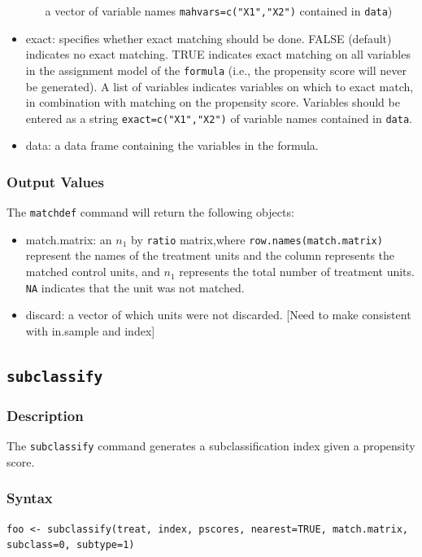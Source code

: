 \documentclass[oneside,letterpaper,titlepage]{article}
\begin{document}
\begin{appendix}
\begin{itemize}
\begin{itemize}
    a vector of variable names \texttt{mahvars=c("X1","X2")} contained in \texttt{data})
  \end{itemize}
\item{exact}: specifies whether exact matching should be done.  FALSE (default) indicates no exact 
  matching.  TRUE indicates exact matching on all variables in the 
  assignment model of the \texttt{formula} (i.e., the propensity score
  will never be generated).  A list of variables indicates variables on
  which to exact match, in combination with matching on the propensity
  score.  Variables should be entered as a  string
  \texttt{exact=c("X1","X2")} of variable names contained in \texttt{data}.
\item{data}: a data frame containing the variables in the formula.
\end{itemize}


\subsubsection{Output Values}
The \texttt{matchdef} command will return the following objects:

\begin{itemize}
\item{match.matrix}: an $n_1$ by \texttt{ratio} matrix,where
  \texttt{row.names(match.matrix)} represent the names of the
  treatment units and the column represents the matched control units, and $n_1$
  represents the total number of treatment units.  \texttt{NA}
  indicates that the unit was not matched. 
\item{discard}: a vector of which units were not discarded. [Need to
  make consistent with in.sample and index]
\end{itemize}

\subsection{\texttt{subclassify}}

\subsubsection{Description}
The \texttt{subclassify} command generates a subclassification index
given a propensity score. 

\subsubsection{Syntax}
\begin{verbatim}
foo <- subclassify(treat, index, pscores, nearest=TRUE, match.matrix,
subclass=0, subtype=1)
\end{verbatim} 


\end{appendix}
\end{document}
